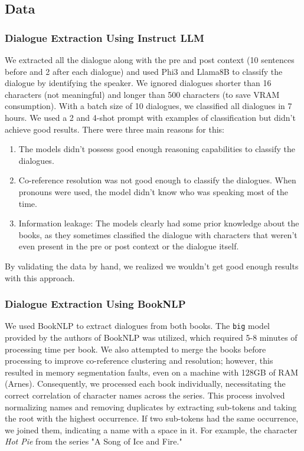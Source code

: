 \documentclass[fleqn,moreauthors,10pt]{ds_report}
\begin{document}
\subsection*{Data}


\subsubsection*{Dialogue Extraction Using Instruct LLM}

We extracted all the dialogue along with the pre and post context (10 sentences before and 2 after each dialogue) and used Phi3 and Llama8B to classify the dialogue by identifying the speaker. We ignored dialogues shorter than 16 characters (not meaningful) and longer than 500 characters (to save VRAM consumption). With a batch size of 10 dialogues, we classified all  dialogues in 7 hours. We used a 2 and 4-shot prompt with examples of classification but didn't achieve good results. There were three main reasons for this:

\begin{enumerate}
	\item The models didn't possess good enough reasoning capabilities to classify the dialogues.
	\item Co-reference resolution was not good enough to classify the dialogues. When pronouns were used, the model didn't know who was speaking most of the time.
	\item Information leakage: The models clearly had some prior knowledge about the books, as they sometimes classified the dialogue with characters that weren't even present in the pre or post context or the dialogue itself.
\end{enumerate}

By validating the data by hand, we realized we wouldn't get good enough results with this approach.


\subsubsection*{Dialogue Extraction Using BookNLP}

We used BookNLP to extract dialogues from both books. The \texttt{big} model provided by the authors of BookNLP was utilized, which required 5-8 minutes of processing time per book. We also attempted to merge the books before processing to improve co-reference clustering and resolution; however, this resulted in memory segmentation faults, even on a machine with 128GB of RAM (Arnes). Consequently, we processed each book individually, necessitating the correct correlation of character names across the series. This process involved normalizing names and removing duplicates by extracting sub-tokens and taking the root with the highest occurrence. If two sub-tokens had the same occurrence, we joined them, indicating a name with a space in it. For example, the character \textit{Hot Pie} from the series "A Song of Ice and Fire."
\end{document}

